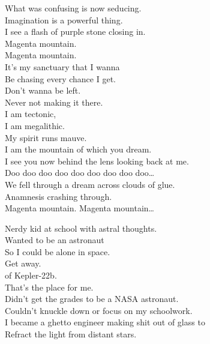 What was confusing is now seducing. \\
Imagination is a powerful thing. \\
I see a flash of purple stone closing in. \\

Magenta mountain. \\
Magenta mountain. \\
It's my sanctuary that I wanna \\
Be chasing every chance I get. \\
Don't wanna be left. \\
Never not making it there. \\

I am tectonic, \\
I am megalithic. \\
My spirit runs mauve. \\
I am the mountain of which you dream. \\
I see you now behind the lens looking back at me. \\

Doo doo doo doo doo doo doo doo doo… \\
We fell through a dream across clouds of glue. \\
Anamnesis crashing through. \\

Magenta mountain. Magenta mountain… \\





Nerdy kid at school with astral thoughts. \\
Wanted to be an astronaut \\
So I could be alone in space. \\

Get away. \\
 of Kepler-22b. \\
That's the place for me. \\

Didn't get the grades to be a NASA astronaut. \\
Couldn't knuckle down or focus on my schoolwork. \\
I became a ghetto engineer making shit out of glass to \\
Refract the light from distant stars. \\

